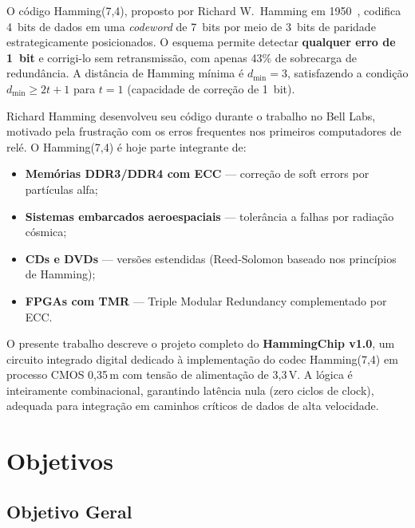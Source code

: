 \documentclass[12pt,a4paper]{article}
\begin{document}
O código Hamming(7,4), proposto por Richard W.\ Hamming em 1950~\cite{hamming1950}, codifica 4~bits de dados em uma \textit{codeword} de 7~bits por meio de 3~bits de paridade estrategicamente posicionados. O esquema permite detectar \textbf{qualquer erro de 1~bit} e corrigi-lo sem retransmissão, com apenas 43\% de sobrecarga de redundância. A distância de Hamming mínima é $d_{\min}=3$, satisfazendo a condição $d_{\min} \geq 2t+1$ para $t=1$ (capacidade de correção de 1~bit).

\begin{unidadebox}
Richard Hamming desenvolveu seu código durante o trabalho no Bell Labs, motivado pela frustração com os erros frequentes nos primeiros computadores de relé. O Hamming(7,4) é hoje parte integrante de:
\begin{itemize}[leftmargin=1.5em]
  \item \textbf{Memórias DDR3/DDR4 com ECC} --- correção de soft errors por partículas alfa;
  \item \textbf{Sistemas embarcados aeroespaciais} --- tolerância a falhas por radiação cósmica;
  \item \textbf{CDs e DVDs} --- versões estendidas (Reed-Solomon baseado nos princípios de Hamming);
  \item \textbf{FPGAs com TMR} --- Triple Modular Redundancy complementado por ECC.
\end{itemize}
\end{unidadebox}

O presente trabalho descreve o projeto completo do \textbf{HammingChip v1.0}, um circuito integrado digital dedicado à implementação do codec Hamming(7,4) em processo CMOS 0,35\,\textmu m com tensão de alimentação de 3,3\,V. A lógica é inteiramente combinacional, garantindo latência nula (zero ciclos de clock), adequada para integração em caminhos críticos de dados de alta velocidade.

\section{Objetivos}

\subsection{Objetivo Geral}
\end{document}

